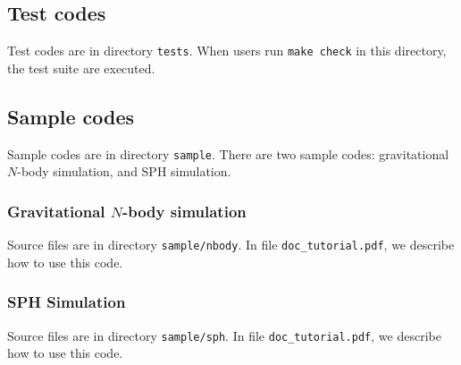 \subsection{Test codes}

Test codes are in directory \texttt{tests}. When users run \texttt{make check}
in this directory, the test suite are executed.

\subsection{Sample codes}

Sample codes are in directory \texttt{sample}. There are two sample codes:
gravitational $N$-body simulation, and SPH simulation.

\subsubsection{Gravitational $N$-body simulation}

Source files are in directory \texttt{sample/nbody}. In file \texttt{doc\_tutorial.pdf},
we describe how to use this code.

\subsubsection{SPH Simulation}

Source files are in directory \texttt{sample/sph}. In file \texttt{doc\_tutorial.pdf},
we describe how to use this code.
